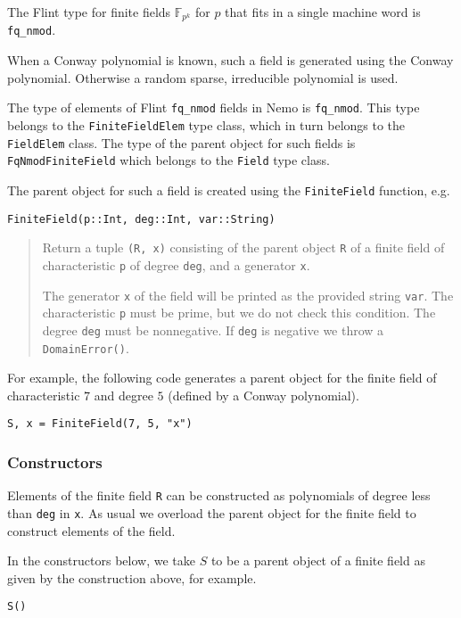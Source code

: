 \documentclass[a4paper,10pt]{article}
\newcommand{\F}{\mathbb{F}}
\newcommand{\code}{\lstinline}
\newcommand{\desc}[1]{\vspace{-3mm}\begin{quote}#1\end{quote}}
\begin{document}
{{The Flint type for finite fields $\F_{p^k}$ for $p$ that fits in a single machine
word is \code{fq_nmod}.

When a Conway polynomial is known, such a field is generated using the 
Conway polynomial. Otherwise a random sparse, irreducible polynomial is used. 

The type of elements of Flint \code{fq_nmod} fields in Nemo is \code{fq_nmod}.
This type belongs to the \code{FiniteFieldElem} type class, which in turn belongs
to the \code{FieldElem} class. The type of the parent object for such fields is
\code{FqNmodFiniteField} which belongs to the \code{Field} type class.

The parent object for such a field is created using the \code{FiniteField}
function, e.g.

\begin{lstlisting}
FiniteField(p::Int, deg::Int, var::String)
\end{lstlisting}

\desc{Return a tuple \code{(R, x)} consisting of the parent object \code{R} of
a finite field of characteristic \code{p} of degree \code{deg}, and a
generator \code{x}. 

The generator \code{x} of the field will be printed as the provided string
\code{var}. The characteristic \code{p} must be prime, but we do not check this
condition. The degree \code{deg} must be nonnegative. If \code{deg} is negative
we throw a \code{DomainError()}.}

For example, the following code generates a parent object for the finite field
of characteristic $7$ and degree $5$ (defined by a Conway polynomial).

\begin{lstlisting}
S, x = FiniteField(7, 5, "x")\end{lstlisting}

\subsubsection{Constructors}

Elements of the finite field \code{R} can be constructed as polynomials of
degree less than \code{deg} in \code{x}. As usual we overload the parent object
for the finite field to construct elements of the field.

In the constructors below, we take $S$ to be a parent object of a finite field
as given by the construction above, for example.

\begin{lstlisting}
S()
\end{lstlisting}

}}
\end{document}
